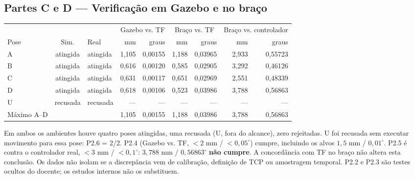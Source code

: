 \subsection{Partes C e D — Verificação em Gazebo e no braço}
\begin{center}\scriptsize
\begin{tabular}{@{}lclrrrrrr@{}}\toprule
& & & \multicolumn{2}{c}{Gazebo vs. TF} & \multicolumn{2}{c}{Braço vs. TF} & \multicolumn{2}{c}{Braço vs. controlador}\\
Pose & Sim. & Real & mm & graus & mm & graus & mm & graus\\\midrule
A & atingida & atingida & 1,105 & 0,00155 & 1,188 & 0,03965 & 2,933 & 0,55723\\
B & atingida & atingida & 0,616 & 0,00120 & 0,585 & 0,02905 & 3,292 & 0,46126\\
C & atingida & atingida & 0,631 & 0,00117 & 0,651 & 0,02969 & 2,551 & 0,48339\\
D & atingida & atingida & 0,618 & 0,00106 & 0,523 & 0,03986 & 3,788 & 0,56863\\
U & recusada & recusada & — & — & — & — & — & —\\\midrule
Máximo A--D & & & 1,105 & 0,00155 & 1,188 & 0,03986 & 3,788 & 0,56863\\\bottomrule
\end{tabular}
\end{center}
Em ambos os ambientes houve quatro poses atingidas, uma recusada (U, fora do alcance), zero rejeitadas. U foi recusada sem executar movimento para essa pose: P2.6 = 2/2. P2.4 (Gazebo vs. TF, $<2$ mm / $<0{,}05^\circ$) cumpre, incluindo os alvos $1{,}5$ mm / $0{,}01^\circ$. P2.5 é contra o controlador real, $<3$ mm / $<0{,}1^\circ$: $3{,}788$ mm / $0{,}56863^\circ$ \textbf{não cumpre}. A concordância com TF no braço não altera esta conclusão. Os dados não isolam se a discrepância vem de calibração, definição de TCP ou amostragem temporal. P2.2 e P2.3 são testes ocultos do docente; os estudos internos não os substituem.

